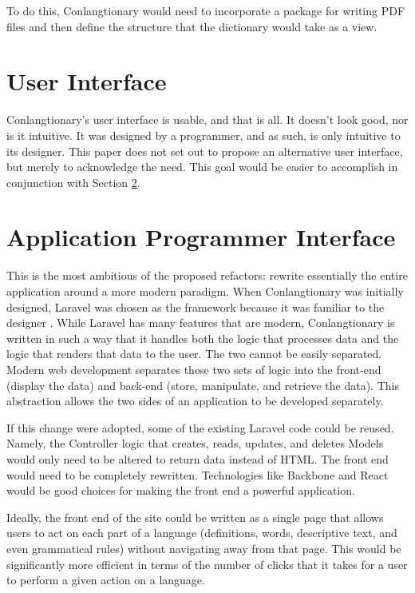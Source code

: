 To do this, Conlangtionary would need to incorporate a package for writing PDF files and then define the structure that the dictionary would take as a view.

\section{User Interface}
\label{sec:refactor-ui}

Conlangtionary's user interface is usable, and that is all. It doesn't look good, nor is it intuitive. It was designed by a programmer, and as such, is only intuitive to its designer. This paper does not set out to propose an alternative user interface, but merely to acknowledge the need. This goal would be easier to accomplish in conjunction with Section \ref{sec:refactor-api}.

\section{Application Programmer Interface}
\label{sec:refactor-api}

This is the most ambitious of the proposed refactors: rewrite essentially the entire application around a more modern paradigm. When Conlangtionary was initially designed, Laravel was chosen as the framework because it was familiar to the designer \cite{Laravel}. While Laravel has many features that are modern, Conlangtionary is written in such a way that it handles both the logic that processes data and the logic that renders that data to the user. The two cannot be easily separated. Modern web development separates these two sets of logic into the front-end (display the data) and back-end (store, manipulate, and retrieve the data). This abstraction allows the two sides of an application to be developed separately.

If this change were adopted, some of the existing Laravel code could be reused. Namely, the Controller logic that creates, reads, updates, and deletes Models would only need to be altered to return data instead of HTML. The front end would need to be completely rewritten. Technologies like Backbone and React would be good choices for making the front end a powerful application.

Ideally, the front end of the site could be written as a single page that allows users to act on each part of a language (definitions, words, descriptive text, and even grammatical rules) without navigating away from that page. This would be significantly more efficient in terms of the number of clicks that it takes for a user to perform a given action on a language.

